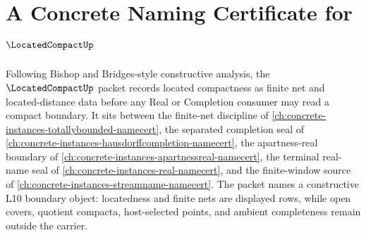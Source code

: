 \chapter{A Concrete Naming Certificate for $\LocatedCompactUp$}
\label{ch:concrete-instances-locatedcompact-namecert}

Following Bishop and Bridges-style constructive analysis, the $\LocatedCompactUp$ packet records located compactness as finite net and located-distance data before any Real or Completion consumer may read a compact boundary. It sits between the finite-net discipline of \autoref{ch:concrete-instances-totallybounded-namecert}, the separated completion seal of \autoref{ch:concrete-instances-hausdorffcompletion-namecert}, the apartness-real boundary of \autoref{ch:concrete-instances-apartnessreal-namecert}, the terminal real-name seal of \autoref{ch:concrete-instances-real-namecert}, and the finite-window source of \autoref{ch:concrete-instances-streamname-namecert}. The packet names a constructive L10 boundary object: locatedness and finite nets are displayed rows, while open covers, quotient compacta, host-selected points, and ambient completeness remain outside the carrier.

